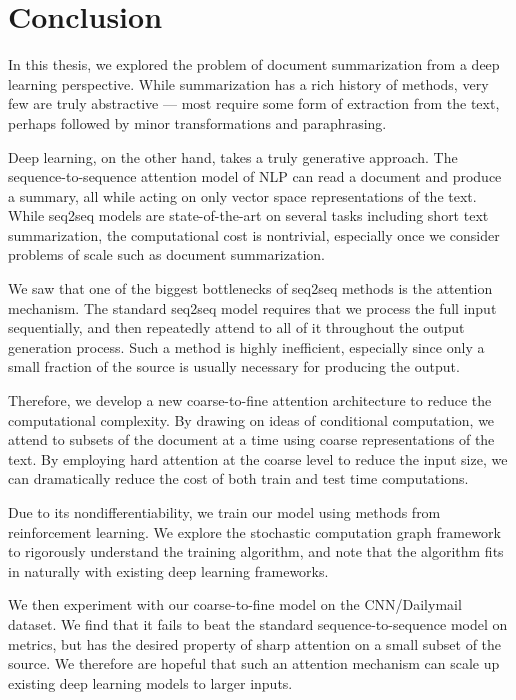 \documentclass[12pt]{report}
\begin{document}
\chapter{Conclusion}
\label{chap:conclusion}

In this thesis, we explored the problem of document summarization from a deep learning perspective. While summarization has a rich history of methods, very few are truly abstractive --- most require some form of extraction from the text, perhaps followed by minor transformations and paraphrasing.

Deep learning, on the other hand, takes a truly generative approach. The sequence-to-sequence attention model of NLP can read a document and produce a summary, all while acting on only vector space representations of the text. 
While seq2seq models are state-of-the-art on several tasks including short text summarization, the computational cost is nontrivial, especially once we consider problems of scale such as document summarization.

We saw that one of the biggest bottlenecks of seq2seq methods is the attention mechanism. The standard seq2seq model requires that we process the full input sequentially, and then repeatedly attend to all of it throughout the output generation process. Such a method is highly inefficient, especially since only a small fraction of the source is usually necessary for producing the output.

Therefore, we develop a new coarse-to-fine attention architecture to reduce the computational complexity. By drawing on ideas of conditional computation, we attend to subsets of the document at a time using coarse representations of the text.
By employing hard attention at the coarse level to reduce the input size, we can dramatically reduce the cost of both train and test time computations.

Due to its nondifferentiability, we train our model using methods from reinforcement learning. We explore the stochastic computation graph framework to rigorously understand the training algorithm, and note that the algorithm fits in naturally with existing deep learning frameworks.

We then experiment with our coarse-to-fine model on the CNN/Dailymail dataset. We find that it fails to beat the standard sequence-to-sequence model on metrics, but has the desired property of sharp attention on a small subset of the source. We therefore are hopeful that such an attention mechanism can scale up existing deep learning models to larger inputs.
\end{document}
